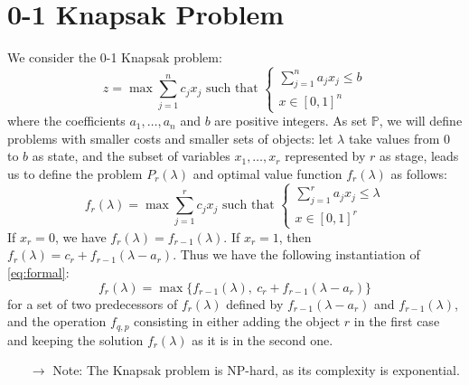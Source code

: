 \documentclass[12pt, openany]{report}
\theoremstyle{definition}
\begin{document}
\section{0-1 Knapsak Problem}
We consider the 0-1 Knapsak problem:
\begin{equation}
    z = \max\sum_{j=1}^n c_jx_j \text{   such that   } \begin{cases}
        \sum_{j=1}^n a_jx_j\le b\\ x\in [0,1]^n
    \end{cases}
\end{equation}
where the coefficients $a_1,\dots,a_n$ and $b$ are positive integers. As set $\mathbb{P}$, we will define problems with smaller costs and smaller sets of objects: let $\lambda$ take values from $0$ to $b$ as state, and the subset of variables $x_1,\dots,x_r$ represented by $r$ as stage, leads us to define the problem $P_r(\lambda)$ and optimal value function $f_r(\lambda)$ as follows:
\begin{equation}
    f_r(\lambda) = \max \sum_{j=1}^r c_jx_j \text{   such that   } \begin{cases}
        \sum_{j=1}^r a_jx_j\le \lambda\\ x\in [0,1]^r
    \end{cases}
\end{equation}
If $x_r=0$, we have $f_r(\lambda)=f_{r-1}(\lambda)$. If $x_r=1$, then $f_r(\lambda) = c_r + f_{r-1}(\lambda - a_r)$. Thus we have the following instantiation of \eqref{eq:formal}:
\begin{equation}
    f_r(\lambda) = \max\{f_{r-1}(\lambda),\:c_r + f_{r-1}(\lambda - a_r)\}
\end{equation}
for a set of two predecessors of $f_r(\lambda)$ defined by $f_{r-1}(\lambda - a_r)$ and $f_{r-1}(\lambda)$, and the operation $f_{q,p}$ consisting in either adding the object $r$ in the first case and keeping the solution $f_r(\lambda)$ as it is in the second one. 
\begin{itemize}
    \item [\(\rightarrow\)] Note: The Knapsak problem is NP-hard, as its complexity is exponential.
\end{itemize}
\end{document}
